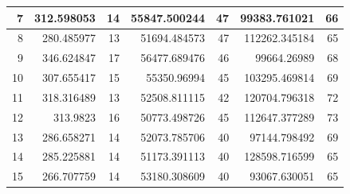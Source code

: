 \begin{table}
\begin{adjustwidth}{}{}
{{\begin{tabular}{|r|r|r|r|r|r|r|}
					\hline
					7                                          & 312.598053                   & 14                                    & 55847.500244                   & 47                                    & 99383.761021                 & 66                                     \\ 
					\hline
					8                                          & 280.485977                   & 13                                    & 51694.484573                   & 47                                    & 112262.345184                & 65                                     \\ 
					\hline
					9                                          & 346.624847                   & 17                                    & 56477.689476                   & 46                                    & 99664.26989                  & 68                                     \\ 
					\hline
					10                                         & 307.655417                   & 15                                    & 55350.96994                    & 45                                    & 103295.469814                & 69                                     \\ 
					\hline
					11                                         & 318.316489                   & 13                                    & 52508.811115                   & 42                                    & 120704.796318                & 72                                     \\ 
					\hline
					12                                         & 313.9823                     & 16                                    & 50773.498726                   & 45                                    & 112647.377289                & 73                                     \\ 
					\hline
					13                                         & 286.658271                   & 14                                    & 52073.785706                   & 40                                    & 97144.798492                 & 69                                     \\ 
					\hline
					14                                         & 285.225881                   & 14                                    & 51173.391113                   & 40                                    & 128598.716599                & 65                                     \\ 
					\hline
					15                                         & 266.707759                   & 14                                    & 53180.308609                   & 40                                    & 93067.630051                 & 65                                     \\ 

\end{tabular}}}
\end{adjustwidth}
\end{table}
